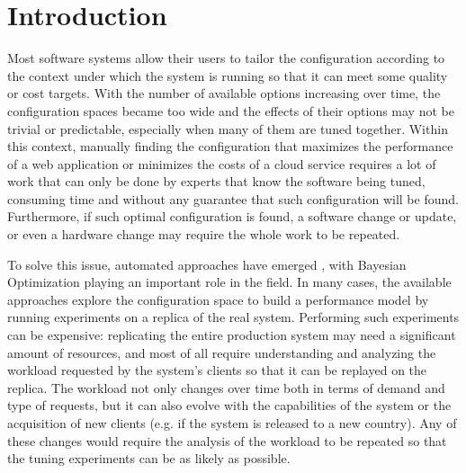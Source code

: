 \documentclass[a4paper, 12pt]{article} %
\begin{document}
	\clearpage%
	\thispagestyle{empty}%
	\addtocounter{page}{-1}%
	\null%
	\clearpage
	
	\renewcommand{\contentsname}{Index}
	\newpage
	\thispagestyle{plain}
	\tableofcontents

	\clearpage%
	\thispagestyle{empty}%
	\addtocounter{page}{-1}%
	\null%
	\clearpage
	
	
	
	\newpage
	
	\section{Introduction }
	Most software systems allow their users to tailor the configuration according to the context under which the system is running so that it can meet some quality or cost targets. With the number of available options increasing over time, the configuration spaces became too wide and the effects of their options may not be trivial or predictable, especially when many of them are tuned together. Within this context, manually finding the configuration that maximizes the performance of a web application or minimizes the costs of a cloud service requires a lot of work that can only be done by experts that know the software being tuned, consuming time and without any guarantee that such configuration will be found. Furthermore, if such optimal configuration is found, a software change or update, or even a hardware change may require the whole work to be repeated.
	
	To solve this issue, automated approaches have emerged \cite{AkamasCGP, LearningToSample, OtterTune, OtterTune2}, with Bayesian Optimization playing an important role in the field. In many cases, the available approaches explore the configuration space to build a performance model by running experiments on a replica of the real system. Performing such experiments can be expensive: replicating the entire production system may need a significant amount of resources, and most of all require understanding and analyzing the workload requested by the system's clients so that it can be replayed on the replica. The workload not only changes over time both in terms of demand and type of requests, but it can also evolve with the capabilities of the system or the acquisition of new clients (e.g. if the system is released to a new country). Any of these changes would require the analysis of the workload to be repeated so that the tuning experiments can be as likely as possible.
	
\end{document}
